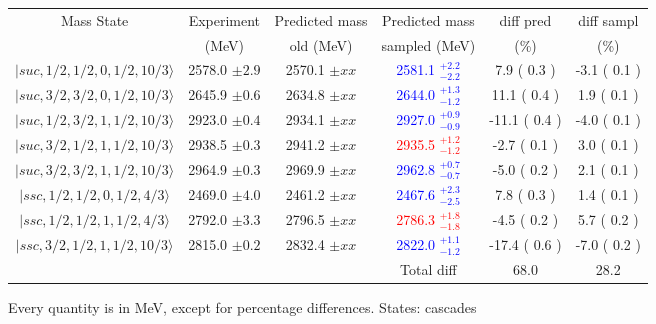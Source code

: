 \begin{tabular}{c | c  c  c  c  c}\hline \hline
Mass State & Experiment  &   Predicted mass  &    Predicted mass & diff pred & diff sampl\\ 
           & (MeV)       &   old (MeV)       &    sampled (MeV)  &     (\%) &     (\%)  \\ \hline
$\vert suc,1/2,1/2,0,1/2,10/3 \rangle$ & 2578.0 $\pm 2.9 $  & 2570.1 $\pm xx$  & \textcolor{blue}{ 2581.1  $^{+ 2.2 }_{ -2.2 }$}  &   7.9 ( 0.3 )  &   -3.1 ( 0.1 ) \\  
$\vert suc,3/2,3/2,0,1/2,10/3 \rangle$ & 2645.9 $\pm 0.6 $  & 2634.8 $\pm xx$  & \textcolor{blue}{ 2644.0  $^{+ 1.3 }_{ -1.2 }$}  &   11.1 ( 0.4 )  &   1.9 ( 0.1 ) \\  
$\vert suc,1/2,3/2,1,1/2,10/3 \rangle$ & 2923.0 $\pm 0.4 $  & 2934.1 $\pm xx$  & \textcolor{blue}{ 2927.0  $^{+ 0.9 }_{ -0.9 }$}  &   -11.1 ( 0.4 )  &   -4.0 ( 0.1 ) \\  
$\vert suc,3/2,1/2,1,1/2,10/3 \rangle$ & 2938.5 $\pm 0.3 $  & 2941.2 $\pm xx$  & \textcolor{red}{ 2935.5  $^{+ 1.2 }_{ -1.2 }$}  &   -2.7 ( 0.1 )  &   3.0 ( 0.1 ) \\  
$\vert suc,3/2,3/2,1,1/2,10/3 \rangle$ & 2964.9 $\pm 0.3 $  & 2969.9 $\pm xx$  & \textcolor{blue}{ 2962.8  $^{+ 0.7 }_{ -0.7 }$}  &   -5.0 ( 0.2 )  &   2.1 ( 0.1 ) \\  
$\vert ssc,1/2,1/2,0,1/2,4/3 \rangle$ & 2469.0 $\pm 4.0 $  & 2461.2 $\pm xx$  & \textcolor{blue}{ 2467.6  $^{+ 2.3 }_{ -2.5 }$}  &   7.8 ( 0.3 )  &   1.4 ( 0.1 ) \\  
$\vert ssc,1/2,1/2,1,1/2,4/3 \rangle$ & 2792.0 $\pm 3.3 $  & 2796.5 $\pm xx$  & \textcolor{red}{ 2786.3  $^{+ 1.8 }_{ -1.8 }$}  &   -4.5 ( 0.2 )  &   5.7 ( 0.2 ) \\  
$\vert ssc,3/2,1/2,1,1/2,10/3 \rangle$ & 2815.0 $\pm 0.2 $  & 2832.4 $\pm xx$  & \textcolor{blue}{ 2822.0  $^{+ 1.1 }_{ -1.2 }$}  &   -17.4 ( 0.6 )  &   -7.0 ( 0.2 ) \\  
\hline
  &  &  & Total diff &  68.0  & 28.2 \\ 
\hline \hline
\end{tabular}
\caption{Every quantity is in MeV, except for percentage differences. States: cascades }
